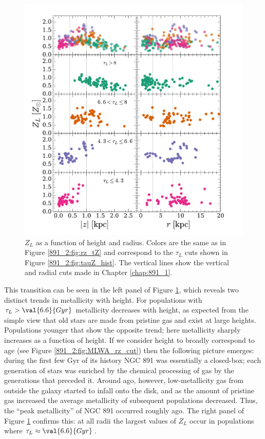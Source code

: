 \begin{figure}
  \centering
  \includegraphics[width=\textwidth]{891_2/figs/MLWZ_rz_cut.pdf}
  \caption[$Z_L$ as function of
    ($r,|z|$)]{\fixspacing\label{891_2:fig:MLWZ_rz_cut}$Z_L$ as a
    function of height and radius. Colors are the same as in Figure
    \ref{891_2:fig:rz_tZ} and correspond to the $\tau_L$ cuts shown in
    Figure \ref{891_2:fig:tauZ_hist}. The vertical lines show the
    vertical and radial cuts made in Chapter \ref{chap:891_1}.}
\end{figure}

This transition can be seen in the left panel of Figure
\ref{891_2:fig:MLWZ_rz_cut}, which reveals two distinct trends in
metallicity with height. For populations with $\tau_L >
\val{6.6}{Gyr}$ metallicity decreases with height, as expected from
the simple view that old stars are made from pristine gas and exist at
large heights. Populations younger that  show the
opposite trend; here metallicity sharply increases as a function of
height. If we consider height to broadly correspond to age (see Figure
\ref{891_2:fig:MLWA_rz_cut}) then the following picture emerges:
during the first few Gyr of its history NGC 891 was essentially a
closed-box; each generation of stars was enriched by the chemical
processing of gas by the generations that preceded it. Around
 ago, however, low-metallicity gas from outside the
galaxy started to infall onto the disk, and as the amount of pristine
gas increased the average metallicity of subsequent populations
decreased. Thus, the ``peak metallicity'' of NGC 891 occurred roughly
 ago. The right panel of Figure
\ref{891_2:fig:MLWZ_rz_cut} confirms this: at all radii the largest
values of $Z_L$ occur in populations where $\tau_L \approx
\val{6.6}{Gyr}$.

